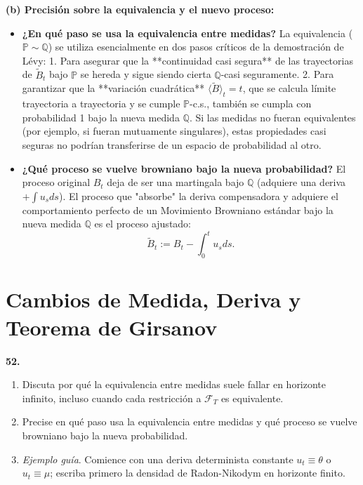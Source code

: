 \documentclass[11pt, letterpaper]{article}
\begin{document}
\begin{solucion}
    \vspace{3mm}
    \textbf{(b) Precisión sobre la equivalencia y el nuevo proceso:}

    \begin{itemize}
        \item \textbf{¿En qué paso se usa la equivalencia entre medidas?}
        La equivalencia ($\mathbb{P} \sim \mathbb{Q}$) se utiliza esencialmente en dos pasos críticos de la demostración de Lévy:
        1. Para asegurar que la **continuidad casi segura** de las trayectorias de $\tilde{B}_t$ bajo $\mathbb{P}$ se hereda y sigue siendo cierta $\mathbb{Q}$-casi seguramente.
        2. Para garantizar que la **variación cuadrática** $\langle \tilde{B} \rangle_t = t$, que se calcula límite trayectoria a trayectoria y se cumple $\mathbb{P}$-c.s., también se cumpla con probabilidad 1 bajo la nueva medida $\mathbb{Q}$. Si las medidas no fueran equivalentes (por ejemplo, si fueran mutuamente singulares), estas propiedades casi seguras no podrían transferirse de un espacio de probabilidad al otro.
        \item \textbf{¿Qué proceso se vuelve browniano bajo la nueva probabilidad?}
        El proceso original $B_t$ deja de ser una martingala bajo $\mathbb{Q}$ (adquiere una deriva $+\int u_s ds$). El proceso que "absorbe" la deriva compensadora y adquiere el comportamiento perfecto de un Movimiento Browniano estándar bajo la nueva medida $\mathbb{Q}$ es el proceso ajustado:
        \[ \tilde{B}_t := B_t - \int_0^t u_s ds. \]
    \end{itemize}
\end{solucion}

\newpage


\section{Cambios de Medida, Deriva y Teorema de Girsanov}

\begin{ejercicio}
    \textbf{52.} 
    \begin{enumerate}
        \item Discuta por qué la equivalencia entre medidas suele fallar en horizonte infinito, incluso cuando cada restricción a $\mathcal{F}_{T}$ es equivalente.
        \item Precise en qué paso usa la equivalencia entre medidas y qué proceso se vuelve browniano bajo la nueva probabilidad.
        \item \textit{Ejemplo guía}. Comience con una deriva determinista constante $u_{t}\equiv\theta$ o $u_{t}\equiv\mu$; escriba primero la densidad de Radon-Nikodym en horizonte finito.
    \end{enumerate}
\end{ejercicio}
\end{document}
